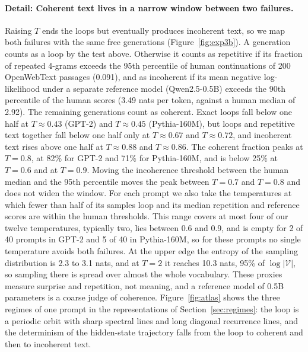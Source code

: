 \paragraph{Detail: Coherent text lives in a narrow window between two failures.} Raising $T$ ends the loops but eventually produces incoherent text, so we map both failures with the same free generations (Figure~\ref{fig:exp3b}). A generation counts as a loop by the test above. Otherwise it counts as repetitive if its fraction of repeated 4-grams exceeds the 95th percentile of human continuations of 200 OpenWebText passages (0.091), and as incoherent if its mean negative log-likelihood under a separate reference model (Qwen2.5-0.5B) exceeds the 90th percentile of the human scores (3.49 nats per token, against a human median of 2.92). The remaining generations count as coherent. Exact loops fall below one half at $T\approx0.43$ (GPT-2) and $T\approx0.45$ (Pythia-160M), but loops and repetitive text together fall below one half only at $T\approx0.67$ and $T\approx0.72$, and incoherent text rises above one half at $T\approx0.88$ and $T\approx0.86$. The coherent fraction peaks at $T=0.8$, at 82\% for GPT-2 and 71\% for Pythia-160M, and is below 25\% at $T=0.6$ and at $T=0.9$. Moving the incoherence threshold between the human median and the 95th percentile moves the peak between $T=0.7$ and $T=0.8$ and does not widen the window. For each prompt we also take the temperatures at which fewer than half of its samples loop and its median repetition and reference scores are within the human thresholds. This range covers at most four of our twelve temperatures, typically two, lies between 0.6 and 0.9, and is empty for 2 of 40 prompts in GPT-2 and 5 of 40 in Pythia-160M, so for these prompts no single temperature avoids both failures. At the upper edge the entropy of the sampling distribution is 2.3 to 3.1 nats, and at $T=2$ it reaches 10.3 nats, 95\% of $\log|\mathcal V|$, so sampling there is spread over almost the whole vocabulary. These proxies measure surprise and repetition, not meaning, and a reference model of 0.5B parameters is a coarse judge of coherence. Figure~\ref{fig:atlas} shows the three regimes of one prompt in the representations of Section~\ref{sec:regimes}: the loop is a periodic orbit with sharp spectral lines and long diagonal recurrence lines, and the determinism of the hidden-state trajectory falls from the loop to coherent and then to incoherent text.

